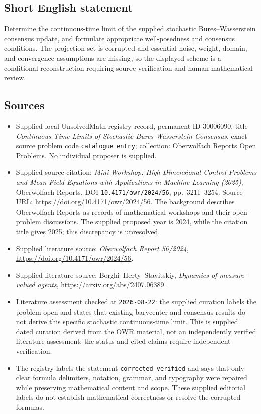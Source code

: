 \documentclass[11pt]{article}
\begin{document}
\subsection{Short English statement}
Determine the continuous-time limit of the supplied stochastic Bures--Wasserstein consensus update, and formulate appropriate well-posedness and consensus conditions. The projection set is corrupted and essential noise, weight, domain, and convergence assumptions are missing, so the displayed scheme is a conditional reconstruction requiring source verification and human mathematical review.
\subsection{Sources}
\begin{itemize}
\item Supplied local UnsolvedMath registry record, permanent ID \(30006090\), title \emph{Continuous-Time Limits of Stochastic Bures-Wasserstein Consensus}, exact source problem code \texttt{catalogue entry}; collection: Oberwolfach Reports Open Problems. No individual proposer is supplied.
\item Supplied source citation: \emph{Mini-Workshop: High-Dimensional Control Problems and Mean-Field Equations with Applications in Machine Learning (2025)}, Oberwolfach Reports, DOI \texttt{10.4171/owr/2024/56}, pp.\ 3211--3254. Source URL: \url{https://doi.org/10.4171/owr/2024/56}. The background describes Oberwolfach Reports as records of mathematical workshops and their open-problem discussions. The supplied proposed year is 2024, while the citation title gives 2025; this discrepancy is unresolved.
\item Supplied literature source: \emph{Oberwolfach Report 56/2024}, \url{https://doi.org/10.4171/owr/2024/56}.
\item Supplied literature source: Borghi--Herty--Stavitskiy, \emph{Dynamics of measure-valued agents}, \url{https://arxiv.org/abs/2407.06389}.
\item Literature assessment checked at \texttt{2026-08-22}: the supplied curation labels the problem open and states that existing barycenter and consensus results do not derive this specific stochastic continuous-time limit. This is supplied dated curation derived from the OWR material, not an independently verified literature assessment; the status and cited claims require independent verification.
\item The registry labels the statement \texttt{corrected\_verified} and says that only clear formula delimiters, notation, grammar, and typography were repaired while preserving mathematical content and scope. These supplied editorial labels do not establish mathematical correctness or resolve the corrupted formulas.
\end{itemize}
\end{document}
